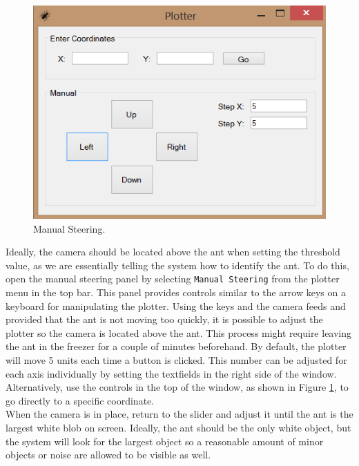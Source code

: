 \begin{figure}[ht!]
  \centering
    \includegraphics[scale=0.7]{img/gui_man_steering}
  \caption{Manual Steering.}
  \label{fig:man_steering}
\end{figure}

Ideally, the camera should be located above the ant when setting the threshold value, as we are essentially telling the system how to identify the ant. To do this, open the manual steering panel by selecting \texttt{Manual Steering} from the plotter menu in the top bar. This panel provides controls similar to the arrow keys on a keyboard for manipulating the plotter. Using the keys and the camera feeds and provided that the ant is not moving too quickly, it is possible to adjust the plotter so the camera is located above the ant. This process might require leaving the ant in the freezer for a couple of minutes beforehand. By default, the plotter will move 5 units each time a button is clicked. This number can be adjusted for each axis individually by setting the textfields in the right side of the window. Alternatively, use the controls in the top of the window, as shown in Figure \ref{fig:man_steering}, to go directly to a specific coordinate. \\

When the camera is in place, return to the slider and adjust it until the ant is the largest white blob on screen. Ideally, the ant should be the only white object, but the system will look for the largest object so a reasonable amount of minor objects or noise are allowed to be visible as well. \\

